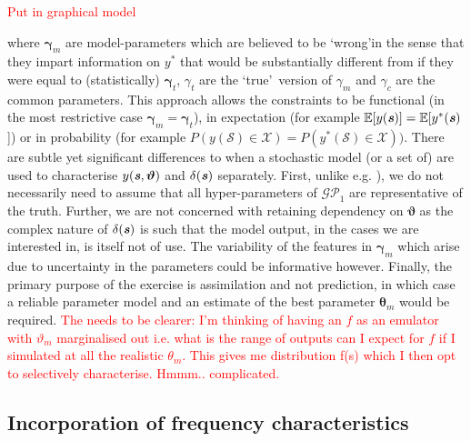 \documentclass[10pt,a4paper]{article}
\newcommand{\red}{\textcolor{red}}
\newcommand{\expect} {{\mathbb{E}}}
\newcommand{\thetab} {{\boldsymbol{\theta}}}
\newcommand{\varthetab} {{\boldsymbol{\vartheta}}}
\newcommand{\gammab} {\boldsymbol{\gamma}}
\newcommand{\svec} {\textbf{\textit{s}}}
\begin{document}
\red{Put in graphical model}

\noindent where $\gammab_m$ are model-parameters which are believed to be \lq wrong\rq in the sense that they impart information on $y^*$ that would be substantially different from if they were equal to (statistically) $\gammab_t$, $\gamma_t$ are the \lq true\rq~version of $\gamma_m$ and $\gamma_c$ are the common parameters. This approach allows the constraints to be functional (in the most restrictive case $\gammab_m = \gammab_t$), in expectation (for example $\expect[y(\svec)] = \expect[y^*(\svec)$]) or in probability (for example $P(y(\mathcal{S}) \in \mathcal{X}) = P(y^*(\mathcal{S}) \in \mathcal{X}))$. There are subtle yet significant differences to when a stochastic model (or a set of) are used to characterise $y(\svec,\varthetab)$ and $\delta(\svec)$ separately. First, unlike e.g. \cite{Higdon_2004}), we do not necessarily need to assume that all hyper-parameters of $\mathcal{GP}_1$ are representative of the truth. Further, we are not concerned with retaining dependency on $\varthetab$ as the complex nature of $\delta(\svec)$ is such that the model output, in the cases we are interested in, is itself not of use. The variability of the features in $\gammab_m$ which arise due to uncertainty in the parameters could be informative however.  Finally, the primary purpose of the exercise is assimilation and not prediction, in which case a reliable parameter model and an estimate of the best parameter $\thetab_m$ would be required. 
\red{The needs to be clearer: I'm thinking of having an $f$ as an emulator with $\vartheta_m$ marginalised out i.e. what is the range of outputs can I expect for $f$ if I simulated at all the realistic $\theta_m$. This gives me distribution f(s) which I then opt to selectively characterise. Hmmm.. complicated.}

\subsection{Incorporation of frequency characteristics}
\end{document}
